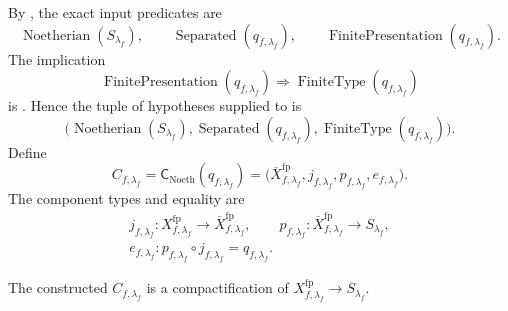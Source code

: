 \begin{definition}
  \label{def:nagata-final-noetherian-compactification}
  \checked\lean{}

  By , the exact input predicates are
  \[
    \operatorname{Noetherian}(S_{\lambda_f}),\qquad
    \operatorname{Separated}(q_{f,\lambda_f}),\qquad
    \operatorname{FinitePresentation}(q_{f,\lambda_f}).           \tag{FNC0}
  \]
  The implication
  \[
    \operatorname{FinitePresentation}(q_{f,\lambda_f})
      \Longrightarrow
    \operatorname{FiniteType}(q_{f,\lambda_f})                    \tag{FNC1}
  \]
  is
  \cite[\href{https://stacks.math.columbia.edu/tag/01TW}{Tag 01TW}]
  {stacks-project}.  Hence the tuple of hypotheses supplied to
   is
  \[
    \bigl(
      \operatorname{Noetherian}(S_{\lambda_f}),
      \operatorname{Separated}(q_{f,\lambda_f}),
      \operatorname{FiniteType}(q_{f,\lambda_f})
    \bigr).                                                        \tag{FNC2}
  \]
  Define
  \[
    C_{f,\lambda_f}
      =\mathsf C_{\mathrm{Noeth}}
        (q_{f,\lambda_f})
      =\bigl(
        \overline X_{f,\lambda_f}^{\mathrm{fp}},
        j_{f,\lambda_f},p_{f,\lambda_f},e_{f,\lambda_f}
        \bigr).
  \]
  The component types and equality are
  \[
  \begin{gathered}
    j_{f,\lambda_f}\colon X_{f,\lambda_f}^{\mathrm{fp}}
      \to\overline X_{f,\lambda_f}^{\mathrm{fp}},\qquad
    p_{f,\lambda_f}\colon\overline X_{f,\lambda_f}^{\mathrm{fp}}
      \to S_{\lambda_f},\\
    e_{f,\lambda_f}\colon
      p_{f,\lambda_f}\circ j_{f,\lambda_f}=q_{f,\lambda_f}.
  \end{gathered}
  \]
\end{definition}

\begin{lemma}
  \label{lemma:nagata-final-noetherian-compactification}
  \checked\lean{}

  The constructed $C_{f,\lambda_f}$ is a compactification of
  $X_{f,\lambda_f}^{\mathrm{fp}}\to S_{\lambda_f}$.
\end{lemma}

